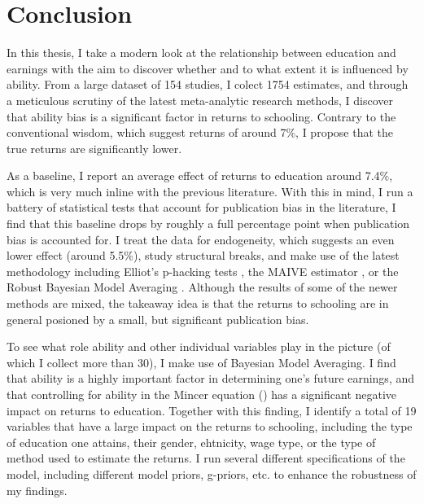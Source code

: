 \chapter{Conclusion}
\label{conclusion}

In this thesis, I take a modern look at the relationship between education and earnings with the aim to discover whether and to what extent it is influenced by ability. From a large dataset of 154 studies, I colect 1754 estimates, and through a meticulous scrutiny of the latest meta-analytic research methods, I discover that ability bias is a significant factor in returns to schooling. Contrary to the conventional wisdom, which suggest returns of around 7\%, I propose that the true returns are significantly lower.

As a baseline, I report an average effect of returns to education around 7.4\%, which is very much inline with the previous literature. With this in mind, I run a battery of statistical tests that account for publication bias in the literature, I find that this baseline drops by roughly a full percentage point when publication bias is accounted for. I treat the data for endogeneity, which suggests an even lower effect (around 5.5\%), study structural breaks, and make use of the latest methodology including Elliot's p-hacking tests \citep{elliott2022hacking}, the MAIVE estimator \citep{irsova2023maive}, or the Robust Bayesian Model Averaging \citep{bartovs2023robust}. Although the results of some of the newer methods are mixed, the takeaway idea is that the returns to schooling are in general posioned by a small, but significant publication bias.

To see what role ability and other individual variables play in the picture (of which I collect more than 30), I make use of Bayesian Model Averaging. I find that ability is a highly important factor in determining one's future earnings, and that controlling for ability in the Mincer equation (\citep{mincer1974schooling}) has a significant negative impact on returns to education. Together with this finding, I identify a total of 19 variables that have a large impact on the returns to schooling, including the type of education one attains, their gender, ehtnicity, wage type, or the type of method used to estimate the returns. I run several different specifications of the model, including different model priors, g-priors, etc. to enhance the robustness of my findings.

